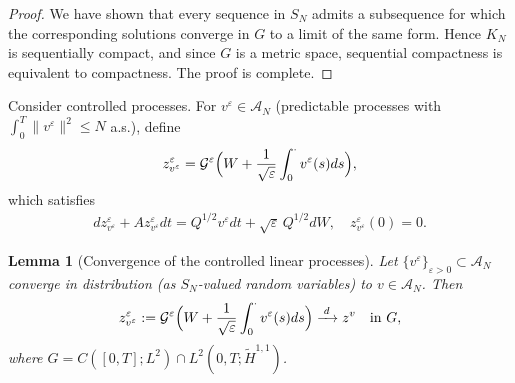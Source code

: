 \documentclass[11pt,a4paper,reqno]{amsart}
\newtheorem{lemma}[theorem]{Lemma}
\theoremstyle{definition}
\begin{document}
\begin{proof}
  We have shown that every sequence in $S_N$ admits a subsequence for which the corresponding solutions
  converge in $G$ to a limit of the same form.  Hence $K_N$ is sequentially compact, and since $G$ is a metric space,
  sequential compactness is equivalent to compactness.  The proof is complete.
\end{proof}

Consider controlled processes. For \(v^\varepsilon\in\mathcal A_N\) (predictable processes with \(\int_0^T\|v^\varepsilon\|^2\le N\) a.s.), define
\[
  z^\varepsilon_{v^\varepsilon} = \mathcal G^\varepsilon\Bigl(W + \frac1{\sqrt\varepsilon}\int_0^\cdot v^\varepsilon(s)ds\Bigr),
\]
which satisfies
\begin{align}\label{eq:lin_controlled}
  dz^\varepsilon_{v^\varepsilon} + A z^\varepsilon_{v^\varepsilon} dt = Q^{1/2}v^\varepsilon dt + \sqrt\varepsilon\,Q^{1/2}dW,\quad z^\varepsilon_{v^\varepsilon}(0)=0 .
\end{align}

\begin{lemma}[Convergence of the controlled linear processes]\label{lem:conv}
  Let $\{v^\varepsilon\}_{\varepsilon>0}\subset\mathcal A_N$ converge in distribution
  (as $S_N$-valued random variables) to $v\in\mathcal A_N$.  Then
  \[
    z^\varepsilon_{v^\varepsilon}:= \mathcal G^\varepsilon\Bigl(W + \frac{1}{\sqrt\varepsilon}\int_0^\cdot v^\varepsilon(s)ds\Bigr)
    \xrightarrow{\;d\;} z^v \quad\text{in } G,
  \]
  where $G = C([0,T];L^2)\cap L^2(0,T;\widetilde H^{1,1})$.
\end{lemma}
\end{document}
